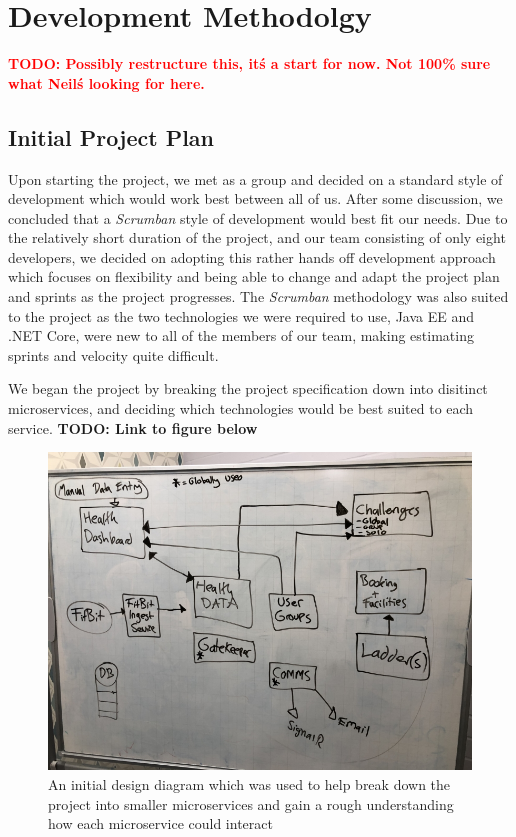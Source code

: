\chapter{Development Methodolgy}

\textcolor{red}{\textbf{TODO: Possibly restructure this, it\'s a start for now. Not 100\% sure what Neil\'s looking for here.}}

\section{Initial Project Plan}

Upon starting the project, we met as a group and decided on a standard style of development which would work best between all of us. After some discussion, we concluded that a \textit{Scrumban}\cite{scrumban} style of development would best fit our needs. Due to the relatively short duration of the project, and our team consisting of only eight developers, we decided on adopting this rather hands off development approach which focuses on flexibility and being able to change and adapt the project plan and sprints as the project progresses. The \textit{Scrumban} methodology was also suited to the project as the two technologies we were required to use, Java EE and .NET Core, were new to all of the members of our team, making estimating sprints and velocity quite difficult. 

We began the project by breaking the project specification down into disitinct microservices, and deciding which technologies would be best suited to each service. \textbf{TODO: Link to figure below}

\begin{figure}[H]
    \centering
    \includegraphics[width=\textwidth]{Images/Initial_Spec_Chart.jpg}
    \caption{An initial design diagram which was used to help break down the project into smaller microservices and gain a rough understanding how each microservice could interact}
\end{figure}


